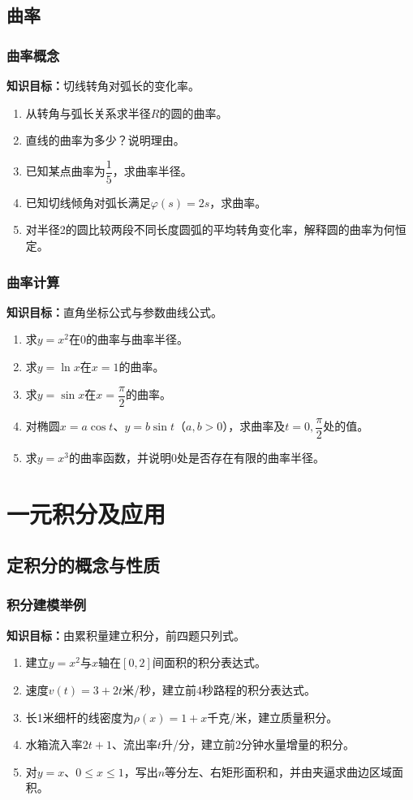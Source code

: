 \documentclass[11pt,a4paper,fontset=fandol]{ctexrep}
\newcommand{\goal}[1]{\textbf{知识目标：}#1\par}
\begin{document}
\section{曲率}
\subsection{曲率概念}
\goal{切线转角对弧长的变化率。}
\begin{enumerate}
\item 从转角与弧长关系求半径$R$的圆的曲率。
\item 直线的曲率为多少？说明理由。
\item 已知某点曲率为$\dfrac{1}{5}$，求曲率半径。
\item 已知切线倾角对弧长满足$\varphi(s)=2s$，求曲率。
\item 对半径2的圆比较两段不同长度圆弧的平均转角变化率，解释圆的曲率为何恒定。
\end{enumerate}
\subsection{曲率计算}
\goal{直角坐标公式与参数曲线公式。}
\begin{enumerate}
\item 求$y=x^2$在0的曲率与曲率半径。
\item 求$y=\ln x$在$x=1$的曲率。
\item 求$y=\sin x$在$x=\dfrac{\pi}{2}$的曲率。
\item 对椭圆$x=a\cos t$、$y=b\sin t$（$a,b>0$），求曲率及$t=0,\dfrac{\pi}{2}$处的值。
\item 求$y=x^3$的曲率函数，并说明0处是否存在有限的曲率半径。
\end{enumerate}
\chapter{一元积分及应用}
\section{定积分的概念与性质}
\subsection{积分建模举例}
\goal{由累积量建立积分，前四题只列式。}
\begin{enumerate}
\item 建立$y=x^2$与$x$轴在$[0,2]$间面积的积分表达式。
\item 速度$v(t)=3+2t$米/秒，建立前4秒路程的积分表达式。
\item 长1米细杆的线密度为$\rho(x)=1+x$千克/米，建立质量积分。
\item 水箱流入率$2t+1$、流出率$t$升/分，建立前2分钟水量增量的积分。
\item 对$y=x$、$0\le x\le1$，写出$n$等分左、右矩形面积和，并由夹逼求曲边区域面积。
\end{enumerate}
\end{document}
